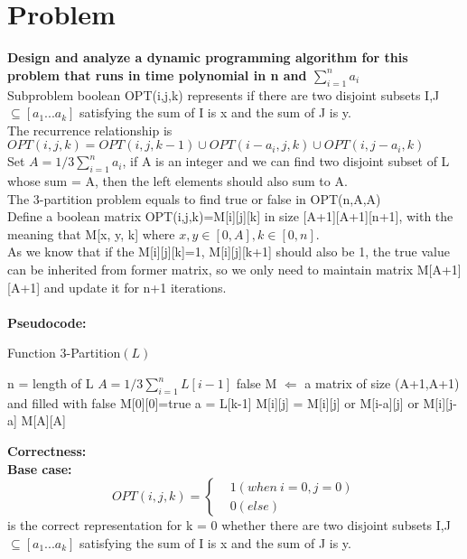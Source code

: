 \documentclass{article}
\begin{document}
\section{Problem \uppercase\expandafter{}}
\textbf{Design and analyze a dynamic programming algorithm for this problem that runs in time polynomial in n and $\sum_{i=1}^n a_i$}\\
Subproblem boolean OPT(i,j,k) represents if there are two disjoint subsets I,J $\subseteq [a_1...a_k]$ satisfying the sum of I is x and the sum of J is y.\\
The recurrence relationship is $OPT(i,j,k) = OPT(i,j,k-1)\cup OPT(i-a_i,j,k)\cup OPT(i,j-a_i,k)$\\
Set $A =1/3\sum_{i=1}^n a_i$, if A is an integer and we can find two disjoint subset of L whose sum = A, then the left elements should also sum to A.\\
The 3-partition problem equals to find true or false in OPT(n,A,A)\\
Define a boolean matrix OPT(i,j,k)=M[i][j][k] in size [A+1][A+1][n+1], with the meaning that M[x, y, k] where $x,y \in [0,A],k \in [0,n]$.\\
As we know that if the M[i][j][k]=1, M[i][j][k+1] should also be 1, the true value can be inherited from former matrix, so we only need to maintain matrix M[A+1][A+1] and update it for n+1 iterations.\\\\
\textbf{\large Pseudocode:}
\begin{algorithm}[H]
  \caption{Function 3-Partition$(L)$}
  \label{alg1}
  \begin{algorithmic}
  \STATE n = length of L
  \STATE $A =1/3\sum_{i=1}^n L[i-1]$ 
  \RETURN false
  \ENDIF
  \STATE M $\Longleftarrow$ a matrix of size (A+1,A+1) and filled with false
  \STATE M[0][0]=true
  \STATE a = L[k-1]
  \STATE M[i][j] = M[i][j] or M[i-a][j] or M[i][j-a]
  \ENDFOR
  \ENDFOR
  \ENDFOR
  \RETURN M[A][A]
  \end{algorithmic}
\end{algorithm}
\noindent\textbf{\large Correctness:\\}
\textbf{Base case:} $$OPT(i,j,k) =\left\{
\begin{aligned} 
 & 1(when\ i = 0,j=0)\\
 & 0(else)
\end{aligned}\right.
$$
is the correct representation for k = 0 whether there are two disjoint subsets I,J $\subseteq [a_1...a_k]$ satisfying the sum of I is x and the sum of J is y.\\
\end{document}
